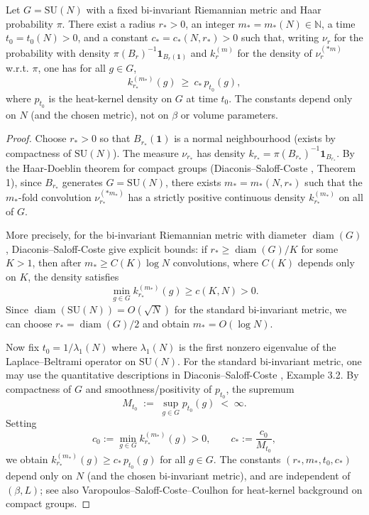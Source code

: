 \documentclass[11pt]{amsart}
\begin{document}
\begin{lemma}\label{lem:ball-conv-lower}
Let $G=\mathrm{SU}(N)$ with a fixed bi-invariant Riemannian metric and Haar probability $\pi$. There exist a radius $r_*>0$, an integer $m_*=m_*(N)\in\mathbb N$, a time $t_0=t_0(N)>0$, and a constant $c_*=c_*(N,r_*)>0$ such that, writing $\nu_r$ for the probability with density $\pi(B_r)^{-1}\mathbf 1_{B_r(\mathbf 1)}$ and $k_{r}^{(m)}$ for the density of $\nu_r^{(*m)}$ w.r.t. $\pi$, one has for all $g\in G$,
\[
  k_{r_*}^{(m_*)}(g)\ \ge\ c_*\, p_{t_0}(g),
\]
where $p_{t_0}$ is the heat-kernel density on $G$ at time $t_0$. The constants depend only on $N$ (and the chosen metric), not on $\beta$ or volume parameters.
\end{lemma}

\begin{proof}
Choose $r_*>0$ so that $B_{r_*}(\mathbf 1)$ is a normal neighbourhood (exists by compactness of $\mathrm{SU}(N)$). The measure $\nu_{r_*}$ has density $k_{r_*}=\pi(B_{r_*})^{-1}\mathbf 1_{B_{r_*}}$. By the Haar-Doeblin theorem for compact groups (Diaconis--Saloff-Coste \cite{DiaconisSaloffCoste2004}, Theorem 1), since $B_{r_*}$ generates $G=\mathrm{SU}(N)$, there exists $m_*=m_*(N,r_*)$ such that the $m_*$-fold convolution $\nu_{r_*}^{(*m_*)}$ has a strictly positive continuous density $k_{r_*}^{(m_*)}$ on all of $G$.

More precisely, for the bi-invariant Riemannian metric with diameter $\operatorname{diam}(G)$, Diaconis--Saloff-Coste give explicit bounds: if $r_* \ge \operatorname{diam}(G)/K$ for some $K>1$, then after $m_* \ge C(K)\log N$ convolutions, where $C(K)$ depends only on $K$, the density satisfies
\[
  \min_{g\in G} k_{r_*}^{(m_*)}(g) \ge c(K,N) > 0.
\]
Since $\operatorname{diam}(\mathrm{SU}(N)) = O(\sqrt{N})$ for the standard bi-invariant metric, we can choose $r_* = \operatorname{diam}(G)/2$ and obtain $m_* = O(\log N)$.

Now fix $t_0 = 1/\lambda_1(N)$ where $\lambda_1(N)$ is the first nonzero eigenvalue of the Laplace--Beltrami operator on $\mathrm{SU}(N)$. For the standard bi-invariant metric, one may use the quantitative descriptions in Diaconis--Saloff-Coste \cite{DiaconisSaloffCoste2004}, Example 3.2. By compactness of $G$ and smoothness/positivity of $p_{t_0}$, the supremum
\[
  M_{t_0} \;:=\; \sup_{g\in G} p_{t_0}(g) \;<\; \infty.
\]
Setting
\[
  c_0 := \min_{g\in G} k_{r_*}^{(m_*)}(g) > 0, \qquad c_* := \frac{c_0}{M_{t_0}},
\]
we obtain $k_{r_*}^{(m_*)}(g) \ge c_*\, p_{t_0}(g)$ for all $g \in G$. The constants $(r_*, m_*, t_0, c_*)$ depend only on $N$ (and the chosen bi-invariant metric), and are independent of $(\beta,L)$; see also Varopoulos–Saloff-Coste–Coulhon \cite{VaropoulosSaloffCosteCoulhon1992} for heat-kernel background on compact groups.
\end{proof}
\end{document}
